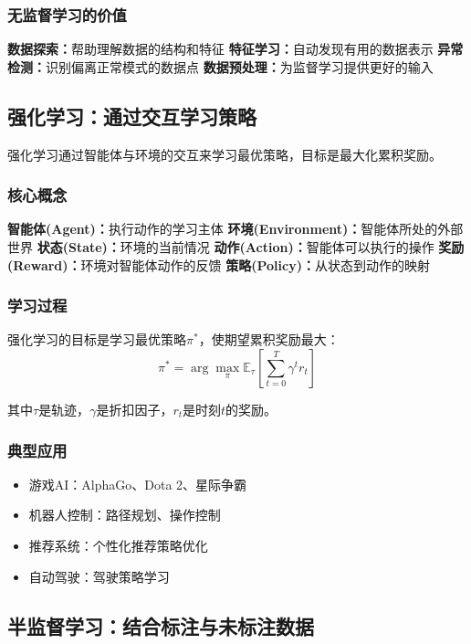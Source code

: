 \subsubsection{无监督学习的价值}

\textbf{数据探索：}帮助理解数据的结构和特征
\textbf{特征学习：}自动发现有用的数据表示
\textbf{异常检测：}识别偏离正常模式的数据点
\textbf{数据预处理：}为监督学习提供更好的输入

\subsection{强化学习：通过交互学习策略}

强化学习通过智能体与环境的交互来学习最优策略，目标是最大化累积奖励。

\subsubsection{核心概念}

\textbf{智能体(Agent)：}执行动作的学习主体
\textbf{环境(Environment)：}智能体所处的外部世界
\textbf{状态(State)：}环境的当前情况
\textbf{动作(Action)：}智能体可以执行的操作
\textbf{奖励(Reward)：}环境对智能体动作的反馈
\textbf{策略(Policy)：}从状态到动作的映射

\subsubsection{学习过程}

强化学习的目标是学习最优策略$\pi^*$，使期望累积奖励最大：
$$\pi^* = \arg\max_\pi \mathbb{E}_\tau[\sum_{t=0}^T \gamma^t r_t]$$

其中$\tau$是轨迹，$\gamma$是折扣因子，$r_t$是时刻$t$的奖励。

\subsubsection{典型应用}

\begin{itemize}
\item 游戏AI：AlphaGo、Dota 2、星际争霸
\item 机器人控制：路径规划、操作控制
\item 推荐系统：个性化推荐策略优化
\item 自动驾驶：驾驶策略学习
\end{itemize}

\subsection{半监督学习：结合标注与未标注数据}

